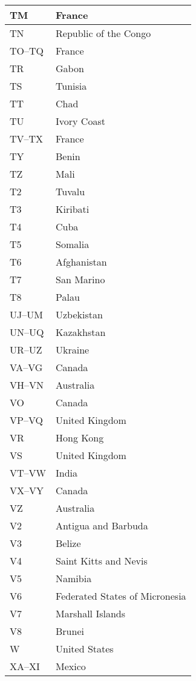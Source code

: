 \begin{longtable}{|l|l|}
	\hline
	TM & France \\
	\hline
	TN & Republic of the Congo \\
	\hline
	TO--TQ & France \\
	\hline
	TR & Gabon \\
	\hline
	TS & Tunisia \\
	\hline
	TT & Chad \\
	\hline
	TU & Ivory Coast \\
	\hline
	TV--TX & France \\
	\hline
	TY & Benin \\
	\hline
	TZ & Mali \\
	\hline
	T2 & Tuvalu \\
	\hline
	T3 & Kiribati \\
	\hline
	T4 & Cuba \\
	\hline
	T5 & Somalia \\
	\hline
	T6 & Afghanistan \\
	\hline
	T7 & San Marino \\
	\hline
	T8 & Palau \\
	\hline
	UJ--UM & Uzbekistan \\
	\hline
	UN--UQ & Kazakhstan \\
	\hline
	UR--UZ & Ukraine \\
	\hline
	VA--VG & Canada \\
	\hline
	VH--VN & Australia \\
	\hline
	VO & Canada \\
	\hline
	VP--VQ & United Kingdom \\
	\hline
	VR & Hong Kong \\
	\hline
	VS & United Kingdom \\
	\hline
	VT--VW & India \\
	\hline
	VX--VY & Canada \\
	\hline
	VZ & Australia \\
	\hline
	V2 & Antigua and Barbuda \\
	\hline
	V3 & Belize \\
	\hline
	V4 & Saint Kitts and Nevis \\
	\hline
	V5 & Namibia \\
	\hline
	V6 & Federated States of Micronesia \\
	\hline
	V7 & Marshall Islands \\
	\hline
	V8 & Brunei \\
	\hline
	W & United States \\
	\hline
	XA--XI & Mexico \\

\end{longtable}
